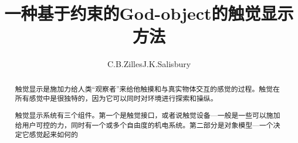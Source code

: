 \documentclass[twocolumn]{ctexart}
\begin{document}
\title{一种基于约束的God-object的触觉显示方法}
\author{C.B.Zilles\quad J.K.Salisbury}
\date{}
\maketitle


\begin{abstract}
触觉显示是施加力给人类“观察者”来给他触摸和与真实物体交互的感觉的过程。触觉在所有感觉中是很独特的，因为它可以同时对环境进行探索和操纵。

触觉显示系统有三个组件。第一个是触觉接口，或者说触觉设备---一般是一些可以施加给用户可控的力，同时有一个或多个自由度的机电系统。第二部分是对象模型---一个决定它感觉起来如何的
\end{abstract}
\end{document}
